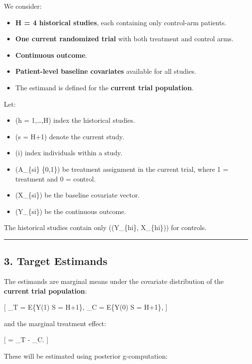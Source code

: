 \documentclass[
  letterpaper,
  DIV=11,
  numbers=noendperiod]{scrartcl}
\providecommand{\tightlist}{%
  \setlength{\itemsep}{0pt}\setlength{\parskip}{0pt}}
\begin{document}
We consider:

\begin{itemize}
\tightlist
\item
  \textbf{H = 4 historical studies}, each containing only control-arm
  patients.
\item
  \textbf{One current randomized trial} with both treatment and control
  arms.
\item
  \textbf{Continuous outcome}.
\item
  \textbf{Patient-level baseline covariates} available for all studies.
\item
  The estimand is defined for the \textbf{current trial population}.
\end{itemize}

Let:

\begin{itemize}
\tightlist
\item
  (h = 1,\dots,H) index the historical studies.
\item
  (s = H+1) denote the current study.
\item
  (i) index individuals within a study.
\item
  (A\_\{si\} \in \{0,1\}) be treatment assignment in the current trial,
  where 1 = treatment and 0 = control.
\item
  (X\_\{si\}) be the baseline covariate vector.
\item
  (Y\_\{si\}) be the continuous outcome.
\end{itemize}

The historical studies contain only ((Y\_\{hi\}, X\_\{hi\})) for
controls.

\begin{center}\rule{0.5\linewidth}{0.5pt}\end{center}

\subsection{3. Target Estimands}\label{target-estimands}

The estimands are marginal means under the covariate distribution of the
\textbf{current trial population}:

{[} \mu\_T = E\{Y(1) \mid S = H+1\}, \qquad \mu\_C = E\{Y(0) \mid S =
H+1\}, {]}

and the marginal treatment effect:

{[} \Delta = \mu\_T - \mu\_C. {]}

These will be estimated using posterior g-computation:
\end{document}
